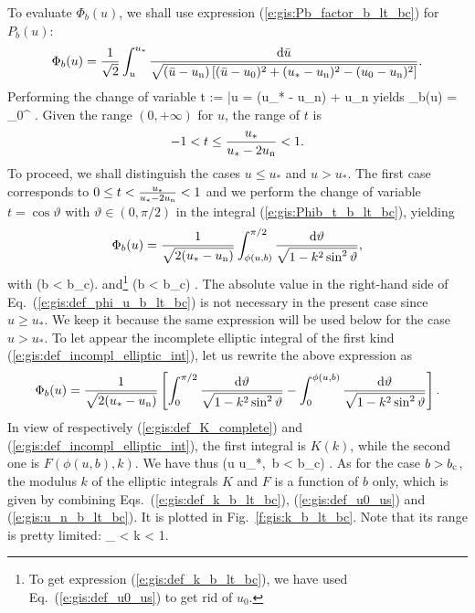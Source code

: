 To evaluate $\Phi_b(u)$, we shall use expression (\ref{e:gis:Pb_factor_b_lt_bc})
for $P_b(u)$:
\[
    \Phi_b(u) = \frac{1}{\sqrt{2}} \int_u^{u_*}
    \frac{\mathrm{d}\bar{u}}{\sqrt{ (\bar{u} - u_{\rm n}) \left[
        (\bar{u} - u_0)^2 + (u_* - u_{\rm n})^2 - (u_0 - u_{\rm n})^2  \right]}} .
\]
Performing the change of variable
\be
    t := 
    \quad\iff\quad
    \bar{u} = (u_* - u_{\rm n})  + u_{\rm n}
\ee
yields
\be \label{e:gis:Phib_t_b_lt_bc}
    \Phi_b(u) =  \int_0^{}
     .
\ee
Given the range $(0, +\infty)$ for $u$, the range of $t$ is
\[
    -1 < t \leq \frac{u_*}{u_* - 2 u_{\rm n}} < 1 .
\]
To proceed, we shall distinguish the cases $u \leq u_*$ and $u> u_*$.
The first case corresponds to $0 \leq t < \frac{u_*}{u_* - 2 u_{\rm n}} < 1$ and we
perform the change of variable $t = \cos\vartheta$ with $\vartheta\in(0, \pi/2)$ in the integral
(\ref{e:gis:Phib_t_b_lt_bc}), yielding
\[
    \Phi_b(u) =  \frac{1}{\sqrt{2(u_* - u_{\rm n})}} \int_{\phi(u,b)}^{\pi/2}
        \frac{\mathrm{d}\vartheta}{\sqrt{1 - k^2 \sin^2\vartheta}} ,
\]
with
\be \label{e:gis:def_phi_u_b_lt_bc}
   \qquad (b < b_{\rm c}).
\ee
and\footnote{To get expression (\ref{e:gis:def_k_b_lt_bc}), we have used
Eq.~(\ref{e:gis:def_u0_us}) to get rid of $u_0$.}
\be \label{e:gis:def_k_b_lt_bc}
    \qquad
    (b < b_{\rm c}) .
\ee
The absolute value in the right-hand side of Eq.~(\ref{e:gis:def_phi_u_b_lt_bc}) is not necessary
in the present case since $u \geq u_*$. We keep it because the same
expression will be used below for the case $u > u_*$.
To let appear the incomplete elliptic integral of the first
kind (\ref{e:gis:def_incompl_elliptic_int}), let us rewrite the above
expression as
\[
   \Phi_b(u) =  \frac{1}{\sqrt{2(u_* - u_{\rm n})}}
   \left[ \int_{0}^{\pi/2}
        \frac{\mathrm{d}\vartheta}{\sqrt{1 - k^2 \sin^2\vartheta}}
        - \int_{0}^{\phi(u, b)}
        \frac{\mathrm{d}\vartheta}{\sqrt{1 - k^2 \sin^2\vartheta}} \right] .
\]
In view of respectively (\ref{e:gis:def_K_complete}) and (\ref{e:gis:def_incompl_elliptic_int}),
the first integral is $K(k)$, while the second one is
$F(\phi(u,b), k)$.
We have thus
\be \label{e:gis:Phib_u_lt_us}
    \qquad (u \leq u_*,\ b < b_{\rm c}) .
\ee
As for the case $b>b_{\rm c}$, the modulus $k$ of the elliptic integrals $K$
and $F$ is a function of $b$ only, which
is given by combining Eqs.~(\ref{e:gis:def_k_b_lt_bc}), (\ref{e:gis:def_u0_us})
and (\ref{e:gis:u_n_b_lt_bc}). It is plotted in Fig.~\ref{f:gis:k_b_lt_bc}.
Note that its range is pretty limited:
\be
    _{}
    < k < 1.
\ee

